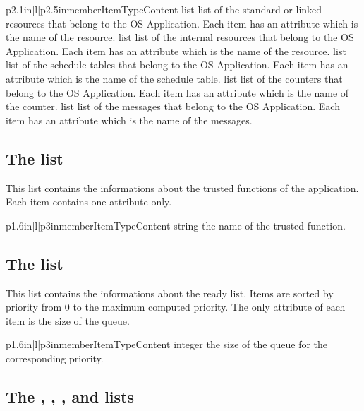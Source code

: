 \begin{longtableiii}{p{2.1in}|l|p{2.5in}}{member}{Item}{Type}{Content}
  {list}
  {list of the standard or linked resources that belong to the OS Application. Each item has an attribute  which is the name of the resource.}
  {list}
  {list of the internal resources that belong to the OS Application. Each item has an attribute  which is the name of the resource.}
  {list}
  {list of the schedule tables that belong to the OS Application. Each item has an attribute  which is the name of the schedule table.}
  {list}
  {list of the counters that belong to the OS Application. Each item has an attribute  which is the name of the counter.}
  {list}
  {list of the messages that belong to the OS Application. Each item has an attribute  which is the name of the messages.}
\end{longtableiii}

\subsection{The  list}

This list contains the informations about the trusted functions of the application. Each item contains one attribute only.

\begin{longtableiii}{p{1.6in}|l|p{3in}}{member}{Item}{Type}{Content}
  {string}
  {the name of the trusted function.}
\end{longtableiii}

\subsection{The  list}

This list contains the informations about the ready list. Items are sorted by priority from 0 to the maximum computed priority. The only attribute of each item is the size of the queue.

\begin{longtableiii}{p{1.6in}|l|p{3in}}{member}{Item}{Type}{Content}
  {integer}
  {the size of the queue for the corresponding priority.}
\end{longtableiii}

\subsection{The , , ,  and  lists}

